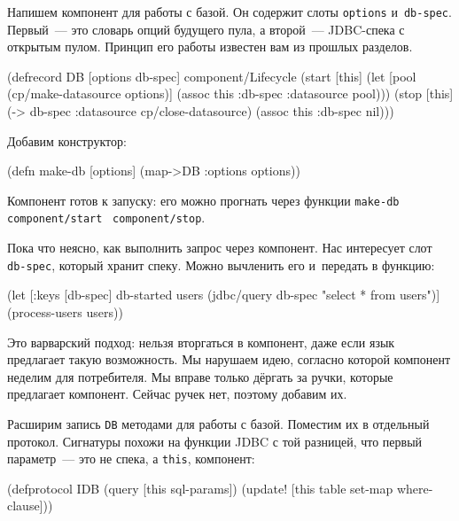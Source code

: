 Напишем компонент для работы с базой. Он содержит слоты \verb|options|
и~\verb|db-spec|. Первый~--- это словарь опций будущего пула, а второй~---
JDBC-спека с открытым пулом. Принцип его работы известен вам из прошлых
разделов.

\begin{english}
  \begin{clojure}
(defrecord DB [options db-spec]
  component/Lifecycle
  (start [this]
    (let [pool (cp/make-datasource options)]
      (assoc this :db-spec {:datasource pool})))
  (stop [this]
    (-> db-spec :datasource cp/close-datasource)
    (assoc this :db-spec nil)))
  \end{clojure}
\end{english}

\noindent
Добавим конструктор:

\begin{english}
  \begin{clojure}
(defn make-db [options]
  (map->DB {:options options}))
  \end{clojure}
\end{english}

Компонент готов к запуску: его можно прогнать через функции
\verb|make-db|~\arr{} \verb|component/start|~\arr{} \verb|component/stop|.

Пока что неясно, как выполнить запрос через компонент. Нас интересует слот
\verb|db-spec|, который хранит спеку. Можно вычленить его и~передать в функцию:

\begin{english}
  \begin{clojure}
(let [{:keys [db-spec]} db-started
      users (jdbc/query db-spec "select * from users")]
  (process-users users))
  \end{clojure}
\end{english}

Это варварский подход: нельзя вторгаться в компонент, даже если язык предлагает
такую возможность. Мы нарушаем идею, согласно которой компонент неделим для
потребителя. Мы вправе только дёргать за ручки, которые предлагает
компонент. Сейчас ручек нет, поэтому добавим их.

Расширим запись \verb|DB| методами для работы с базой. Поместим их в отдельный
протокол. Сигнатуры похожи на функции JDBC с той разницей, что первый параметр~---
это не спека, а \verb|this|, компонент:


\begin{english}
  \begin{clojure}
(defprotocol IDB
  (query [this sql-params])
  (update! [this table set-map where-clause]))
  \end{clojure}
\end{english}

